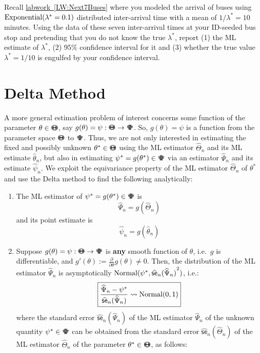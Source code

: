 {\begin{labwork} \label{LW:IDSeededBusStopMLECI}
Recall \hyperref[LW:Next7Buses]{labwork~\ref*{LW:Next7Buses}} where you modeled the arrival of buses using $\mbox{{\rm Exponential}}(\lambda^*=0.1)$ distributed inter-arrival time with a mean of $1/\lambda^*=10$ minutes.  Using the data of these seven inter-arrival times at your ID-seeded bus stop and pretending that you do not know the true $\lambda^*$, report (1) the ML estimate of $\lambda^*$, (2) $95\%$ confidence interval for it and (3) whether the true value $\lambda^*=1/10$ is engulfed by your confidence interval.  
\end{labwork}

\section{Delta Method}\label{S:DeltaMethod}
A more general estimation problem of interest concerns some function of the parameter $\theta \in {\Theta}\mspace{-11 mu}{\Theta}$, say $g(\theta)=\psi:{\Theta}\mspace{-11 mu}{\Theta} \to {\Psi}\mspace{-11 mu}{\Psi}$.  So, $g(\theta)=\psi$ is a function from the parameter space ${\Theta}\mspace{-11 mu}{\Theta}$ to ${\Psi}\mspace{-11 mu}{\Psi}$.  Thus, we are not only interested in estimating the fixed and possibly unknown $\theta^* \in {\Theta}\mspace{-11 mu}{\Theta}$ using the ML estimator $\widehat{\Theta}_n$ and its ML estimate $\widehat{\theta}_n$, but also in estimating $\psi^* = g(\theta^*) \in {\Psi}\mspace{-11 mu}{\Psi}$ via an estimator $\widehat{\Psi}_n$ and its estimate $\widehat{\psi}_n$.  We exploit the equivariance property of the ML estimator $\widehat{\Theta}_n$ of $\theta^*$ and use the Delta method to find the following analytically:
\begin{enumerate}
\item The ML estimator of $\psi^*=g(\theta^*) \in {\Psi}\mspace{-11 mu}{\Psi}$ is 
$$\boxed{\widehat{\Psi}_n = g(\widehat{\Theta}_n)}$$ 
and its point estimate is 
$$\boxed{\widehat{\psi}_n=g(\widehat{\theta}_n)}$$
\item Suppose $g(\theta)=\psi:{\Theta}\mspace{-11 mu}{\Theta} \to {\Psi}\mspace{-11 mu}{\Psi}$ is {\bf any} smooth function of $\theta$, i.e.~$g$ is differentiable, and $g'(\theta) := \frac{\partial}{\partial \theta}g(\theta) \neq 0$.  Then, the distribution of the ML estimator $\widehat{\Psi}_n$ is asymptotically $\mbox{{\rm Normal}}(\psi^*, {\widehat{\mathsf{se}}_n(\widehat{\Psi}_n)}^2)$, i.e.:
\[
\boxed{
\frac{\widehat{\Psi}_n - \psi^*}{\widehat{\mathsf{se}}_n(\widehat{\Psi}_n)} \rightsquigarrow
\mbox{{\rm Normal}}(0,1)
}
\]
where the standard error $\widehat{\mathsf{se}}_n(\widehat{\Psi}_n)$ of the ML estimator $\widehat{\Psi}_n$ of the unknown quantity $\psi^* \in {\Psi}\mspace{-11 mu}{\Psi}$ can be obtained from the standard error $\widehat{\mathsf{se}}_n(\widehat{\Theta}_n)$ of the ML estimator $\widehat{\Theta}_n$ of the parameter $\theta^* \in {\Theta}\mspace{-11 mu}{\Theta}$, as follows:

\end{enumerate}}
